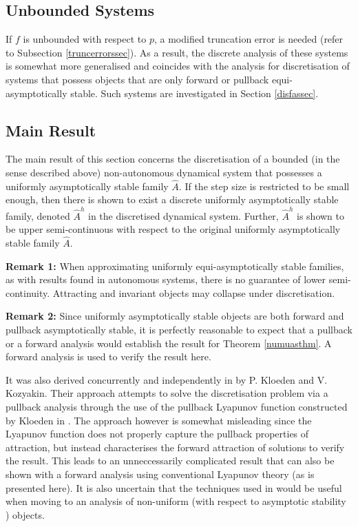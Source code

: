 \subsection{Unbounded Systems}

If $f$ is unbounded with respect to $p$, a modified truncation
error is needed (refer to Subsection \ref{truncerrorssec}). As a result, the discrete analysis of these systems is somewhat more generalised and coincides with the analysis for discretisation of systems that possess objects that are only forward or pullback equi-asymptotically stable.  Such systems are investigated in Section \ref{disfassec}.

\subsection{Main Result}

The main result of this section concerns the discretisation of a
bounded (in the sense described above) non-autonomous dynamical system that
possesses a uniformly asymptotically stable family $\hat{A}$. If the step
size is restricted to be small enough, then there is shown to exist a discrete
uniformly asymptotically stable family, denoted $\hat{A}^h$ in the discretised
dynamical system. Further, $\hat{A}^h$ is shown to be upper semi-continuous with
respect to the original uniformly asymptotically stable family $\hat{A}$.

{\bf Remark 1:} When approximating uniformly equi-asymptotically stable
families, as with results found in autonomous systems, there is no guarantee of
lower semi-continuity. Attracting and invariant objects may collapse under
discretisation.

{\bf Remark 2:} Since uniformly asymptotically stable objects are both forward and pullback asymptotically stable, it is perfectly reasonable to expect that a pullback or a forward analysis would establish the result for Theorem \ref{numuasthm}. A forward analysis is used to verify the result here.

It was also derived concurrently and independently in \cite{KlKo01}
by P. Kloeden and V. Kozyakin. Their approach attempts to solve the discretisation problem via a pullback analysis through the use of the pullback Lyapunov function constructed by Kloeden in \cite{Kl98}. The approach however is somewhat misleading since the Lyapunov function does not properly capture the pullback properties of attraction, but instead characterises the forward attraction of solutions to verify the result. This leads to an unneccessarily complicated result that can also be shown with a forward analysis using conventional Lyapunov theory (as is presented here). It is also uncertain that the techniques used in \cite{KlKo01} would be useful when moving to an analysis of non-uniform (with respect to asymptotic stability ) objects.

